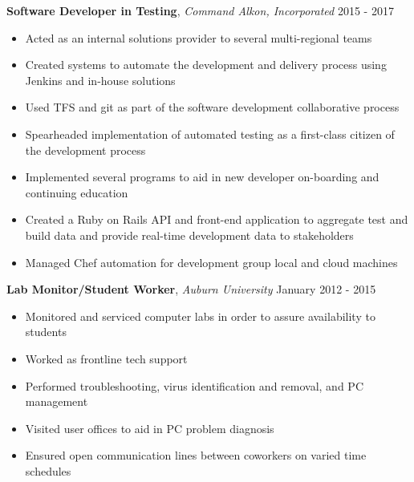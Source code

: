 \documentclass[9pt]{article}
\newenvironment{changemargin}[2]{%
  \begin{list}{}{%
    \setlength{\topsep}{0pt}%
    \setlength{\leftmargin}{#1}%
    \setlength{\rightmargin}{#2}%
    \setlength{\listparindent}{\parindent}%
    \setlength{\itemindent}{\parindent}%
    \setlength{\parsep}{\parskip}%
  }%
  \item[]}{\end{list}
}
\newenvironment{body} {
	\vspace*{-16pt}
	\begin{changemargin}{-0.25in}{-0.5in}
  }	
	{\end{changemargin}
}
\begin{document}
\begin{body}
	\vspace{17pt}
	\textbf{Software Developer in Testing}, \emph{Command Alkon, Incorporated} \hfill 2015 - 2017 \\
	\vspace*{-4pt}
	\begin{itemize} \itemsep -0pt  %
		\item Acted as an internal solutions provider to several multi-regional teams
		\item Created systems to automate the development and delivery process using Jenkins and in-house solutions
		\item Used TFS and git as part of the software development collaborative process
		\item Spearheaded implementation of automated testing as a first-class citizen of the development process
		\item Implemented several programs to aid in new developer on-boarding and continuing education
		\item Created a Ruby on Rails API and front-end application to aggregate test and build data and provide real-time development data to stakeholders
		\item Managed Chef automation for development group local and cloud machines
	\end{itemize}
	\vspace{17pt}

	\textbf{Lab Monitor/Student Worker}, \emph{Auburn University} \hfill January 2012 - 2015\\
	\vspace*{-4pt}
	\begin{itemize} \itemsep -0pt  %
		\item Monitored and serviced computer labs in order to assure availability to students
		\item Worked as frontline tech support
		\item Performed troubleshooting, virus identification and removal, and PC management
		\item Visited user offices to aid in PC problem diagnosis
		\item Ensured open communication lines between coworkers on varied time schedules
	\end{itemize}
	\vspace{17pt}


\end{body}
\end{document}
